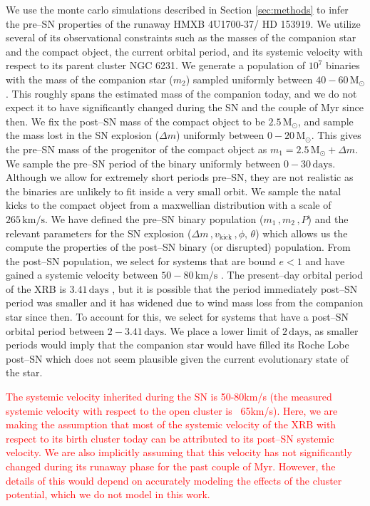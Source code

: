 \documentclass[linenumbers,trackchanges,twocolumn]{aastex701}
\newcommand{\Mdot}{\mathrm{M}_{\odot}}
\newcommand{\red}{\textcolor{red}}
\begin{document}
We use the monte carlo simulations described in Section \ref{sec:methods} to infer the pre--SN properties of the runaway HMXB 4U1700-37/ HD 153919. We utilize several of its observational constraints such as the masses of the companion star and the compact object, the current orbital period, and its systemic velocity with respect to its parent cluster NGC 6231. We generate a population of $10^7$ binaries with the mass of the companion star ($m_2$) sampled uniformly between $40-60\,\Mdot$. This roughly spans the estimated mass of the companion today, and we do not expect it to have significantly changed during the SN and the couple of $\mathrm{Myr}$ since then. We fix the post--SN mass of the compact object to be $2.5 \, \Mdot$, and sample the mass lost in the SN explosion ($\Delta m$) uniformly between $0-20 \, \Mdot$. This gives the pre--SN mass of the progenitor of the compact object as $m_1 = 2.5\, \Mdot + \Delta m$. We sample the pre--SN period of the binary uniformly between $0-30\, \mathrm{days}$. Although we allow for extremely short periods pre--SN, they are not realistic as the binaries are unlikely to fit inside a very small orbit. We sample the natal kicks to the compact object from a maxwellian distribution with a scale of $265 \, \mathrm{km/s}$. We have defined the pre--SN binary population ($m_1\,, m_2\,, P$) and the relevant parameters for the SN explosion ($\Delta m\,, v_{\mathrm{kick}}\,, \phi,\, \theta$) which allows us the compute the properties of the post--SN binary (or disrupted) population. From the post--SN population, we select for systems that are bound $e<1$ and have gained a systemic velocity between $50-80 \, \mathrm{km/s}$ \cite{2021A&A...655A..31V}. The present--day orbital period of the XRB is $3.41 \, \mathrm{days}$ \cite{2016MNRAS.461..816I}, but it is possible that the period immediately post--SN period was smaller and it has widened due to wind mass loss from the companion star since then. To account for this, we select for systems that have a post--SN orbital period between $2-3.41 \, \mathrm{days}$. We place a lower limit of $2 \, \mathrm{days}$, as smaller periods would imply that the companion star would have filled its Roche Lobe post--SN which does not seem plausible given the current evolutionary state of the star. 

\red{The systemic velocity inherited during the SN is 50-80km/s (the measured systemic velocity with respect to the open cluster is ~65km/s). Here, we are making the assumption that most of the systemic velocity of the XRB with respect to its birth cluster today can be attributed to its post--SN systemic velocity. We are also implicitly assuming that this velocity has not significantly changed during its runaway phase for the past couple of Myr. However, the details of this would depend on accurately modeling the effects of the cluster potential, which we do not model in this work.}
\end{document}
